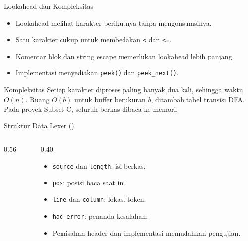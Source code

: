 \documentclass[aspectratio=169,10pt,t]{beamer}
\begin{document}
\begin{frame}{Lookahead dan Kompleksitas}
  \begin{itemize}
    \item Lookahead melihat karakter berikutnya tanpa mengonsumsinya.
    \item Satu karakter cukup untuk membedakan \texttt{<} dan
          \texttt{<=}.
    \item Komentar blok dan string escape memerlukan lookahead lebih
          panjang.
    \item Implementasi menyediakan \texttt{peek()} dan
          \texttt{peek\_next()}.
  \end{itemize}

  \vspace{4pt}
  \begin{block}{Kompleksitas}
    \footnotesize
    Setiap karakter diproses paling banyak dua kali, sehingga waktu
    \(O(n)\). Ruang \(O(b)\) untuk buffer berukuran \(b\), ditambah tabel
    transisi DFA. Pada proyek Subset-C, seluruh berkas dibaca ke memori.
  \end{block}
\end{frame}

\begin{frame}[fragile]{Struktur Data Lexer ()}
  \begin{columns}[T,onlytextwidth]
    \begin{column}{0.56\textwidth}
      
    \end{column}
    \begin{column}{0.40\textwidth}
      \begin{itemize}
        \item \texttt{source} dan \texttt{length}: isi berkas.
        \item \texttt{pos}: posisi baca saat ini.
        \item \texttt{line} dan \texttt{column}: lokasi token.
        \item \texttt{had\_error}: penanda kesalahan.
        \item Pemisahan header dan implementasi memudahkan pengujian.
      \end{itemize}
    \end{column}
  \end{columns}
\end{frame}
\end{document}
